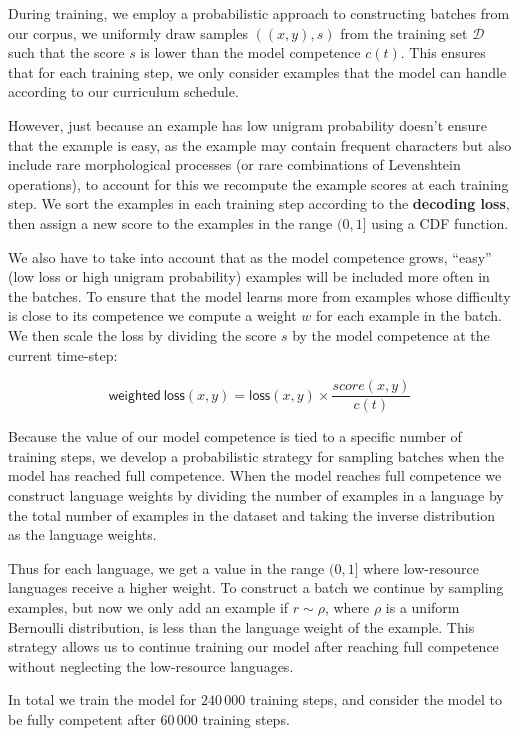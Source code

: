 \documentclass[11pt,a4paper]{article}
\begin{document}
During training, we employ a probabilistic approach to constructing
batches from our corpus, we uniformly draw samples $((x, y), s)$ from
the training set $\mathcal{D}$ such that the score $s$ is lower than
the model competence $c(t)$. This ensures that for each training
step, we only consider examples that the model can handle according
to our curriculum schedule.

However, just because an example has low unigram probability doesn't
ensure that the example is easy, as the example may contain frequent
characters but also include rare morphological processes (or rare
combinations of Levenshtein operations), to account for this we
recompute the example scores at each training step. We sort the
examples in each training step according to the \textbf{decoding
loss}, then assign a new score to the examples in the range
$(0, 1]$ using a CDF function.

We also have to take into account that as the model competence grows,
``easy'' (low loss or high unigram probability) examples will be
included more often in the batches. To ensure that the model learns
more from examples whose difficulty is close to its competence we
compute a weight $w$ for each example in the batch. We then scale the
loss by dividing the score $s$ by the model competence at the current
time-step:

\begin{equation}
\mathsf{weighted\ loss}(x, y) = \mathsf{loss}(x, y) \times \frac{score(x, y)}{c(t)}
\end{equation}

Because the value of our model competence is tied to a specific number
of training steps, we develop a probabilistic strategy for sampling
batches when the model has reached full competence.  When the model
reaches full competence we construct language weights by dividing the
number of examples in a language by the total number of examples in
the dataset and taking the inverse distribution as the language
weights.

Thus for each language, we get a value in the range $(0,1]$ where
low-resource languages receive a higher weight.  To construct a batch
we continue by sampling examples, but now we only add an example if
$r \sim \rho$, where $\rho$ is a uniform Bernoulli distribution, is
less than the language weight of the example.  This strategy allows us
to continue training our model after reaching full competence without
neglecting the low-resource languages.

In total we train the model for $240\,000$ training steps, and consider
the model to be fully competent after $60\,000$ training steps.
\end{document}
